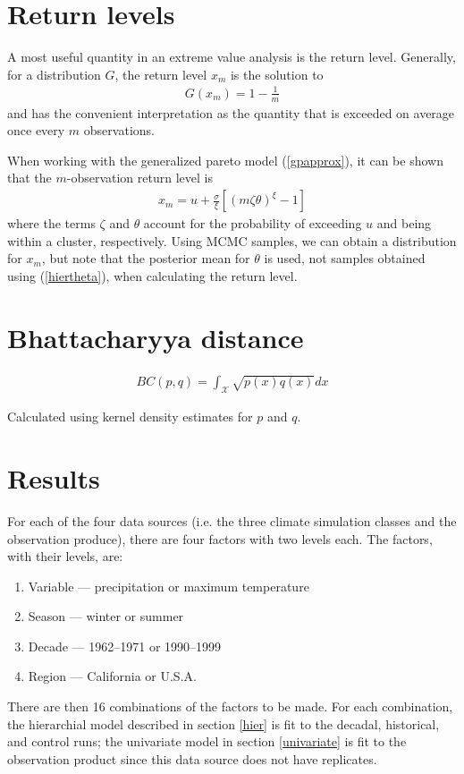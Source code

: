 \documentclass[12pt]{article}
\begin{document}
\section{Return levels}
\label{return}

A most useful quantity in an extreme value analysis is the return level. Generally, for a distribution $G$, the return level $x_m$ is the solution to
\begin{align}
G(x_m) = 1-\frac{1}{m}
\end{align}
and has the convenient interpretation as the quantity that is exceeded on average once every $m$ observations.

When working with the generalized pareto model (\ref{gpapprox}), it can be shown that the $m$-observation return level is
\begin{align}
x_m = u +\frac{\sigma}{\xi}\left[\left(m\zeta\theta\right)^\xi-1\right] \label{rl}
\end{align}
where the terms $\zeta$ and $\theta$ account for the probability of exceeding $u$ and being within a cluster, respectively. Using MCMC samples, we can obtain a distribution for $x_m$, but note that the posterior mean for $\theta$ is used, not samples obtained using (\ref{hiertheta}), when calculating the return level.


\section{Bhattacharyya distance}
\label{bhatta}

\begin{align}
BC(p,q)=\int_\mathcal{X} \sqrt{p(x)q(x)} dx
\end{align}

Calculated using kernel density estimates for $p$ and $q$.

\cite{bhattacharyya1943measure}


\section{Results}
\label{results}

For each of the four data sources (i.e. the three climate simulation classes and the observation produce), there are four factors with two levels each. The factors, with their levels, are:
\begin{enumerate}
\item Variable --- precipitation or maximum temperature
\item Season --- winter or summer
\item Decade --- 1962--1971 or 1990--1999
\item Region --- California or U.S.A.
\end{enumerate}
There are then 16 combinations of the factors to be made. For each combination, the hierarchial model described in section \ref{hier} is fit to the decadal, historical, and control runs; the univariate model in section \ref{univariate} is fit to the observation product since this data source does not have replicates.
\end{document}
